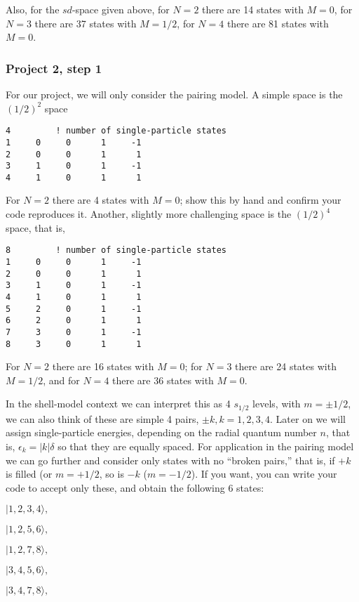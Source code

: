 Also, 
for the $sd$-space given above, for $N=2$ there are 14 states with $M=0$, for $N=3$ there are 37 
states with $M=1/2$, for $N=4$ there are 81 states with $M=0$.

\frametitle{Project 2, step 1}
For our project, we will only consider the pairing model.
A simple space is the $(1/2)^2$ space
\begin{verbatim}
4         ! number of single-particle states
1     0     0      1     -1
2     0     0      1      1
3     1     0      1     -1
4     1     0      1      1
\end{verbatim}
For $N=2$ there are 4 states with $M=0$; show this by hand and confirm your code reproduces it. 
Another, slightly more challenging space is the $(1/2)^4$ space, that is, 
\begin{verbatim}
8         ! number of single-particle states
1     0     0      1     -1
2     0     0      1      1
3     1     0      1     -1
4     1     0      1      1
5     2     0      1     -1
6     2     0      1      1
7     3     0      1     -1
8     3     0      1      1
\end{verbatim}

For $N=2$ there are 16 states with $M=0$; for $N=3$ there are 24 states with $M=1/2$, and for 
$N=4$ there are 36 states with $M=0$. 

In the shell-model context we can interpret this as 4 $s_{1/2}$ levels, with $m = \pm 1/2$, we can also think of these are simple 4 pairs,  $\pm k, k = 1,2,3,4$. Later on we will 
assign single-particle energies,  depending on the radial quantum number $n$, that is, 
$\epsilon_k = |k| \delta$ so that they are equally spaced.
For application in the pairing model we can go further and consider only states with 
no ``broken pairs,'' that is, if $+k$ is filled (or $m = +1/2$, so is $-k$ ($m=-1/2$). 
If you want, you can write your code to accept only these, and obtain the following 
6 states:

$|           1,           2 ,          3         ,       4  \rangle , $

$|            1      ,     2        ,        5         ,       6 \rangle , $

$|            1         ,       2     ,           7         ,       8  \rangle , $

$|            3        ,        4      ,          5          ,      6  \rangle , $

$|            3        ,        4      ,          7         ,       8  \rangle , $

